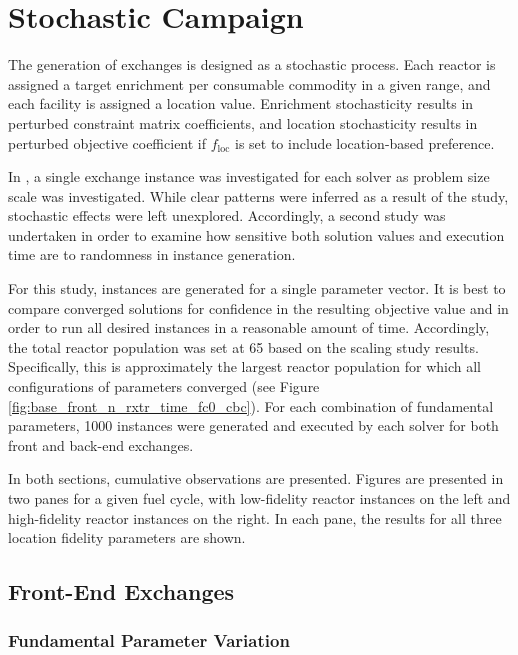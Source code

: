 
\section{Stochastic Campaign}\label{results:stochastic}

The generation of exchanges is designed as a stochastic process. Each reactor is
assigned a target enrichment per consumable commodity in a given range, and each
facility is assigned a location value. Enrichment stochasticity results in
perturbed constraint matrix coefficients, and location stochasticity results in
perturbed objective coefficient if $f_{\text{loc}}$ is set to include
location-based preference.

In , a single exchange instance was investigated for each
solver as problem size scale was investigated. While clear patterns were
inferred as a result of the study, stochastic effects were left
unexplored. Accordingly, a second study was undertaken in order to examine how
sensitive both solution values and execution time are to randomness in instance
generation.

For this study, instances are generated for a single parameter vector. It is
best to compare converged \cbc solutions for confidence in the resulting
objective value and in order to run all desired instances in a reasonable amount
of time. Accordingly, the total reactor population was set at 65 based on the
scaling study results. Specifically, this is approximately the largest reactor
population for which all configurations of parameters converged (see Figure
\ref{fig:base_front_n_rxtr_time_fc0_cbc}). For each combination of fundamental
parameters, 1000 instances were generated and executed by each solver for both
front and back-end exchanges.

In both sections, cumulative observations are presented. Figures are presented
in two panes for a given fuel cycle, with low-fidelity reactor instances on the
left and high-fidelity reactor instances on the right. In each pane, the results
for all three location fidelity parameters are shown.

\subsection{Front-End Exchanges}

\subsubsection{Fundamental Parameter Variation}

